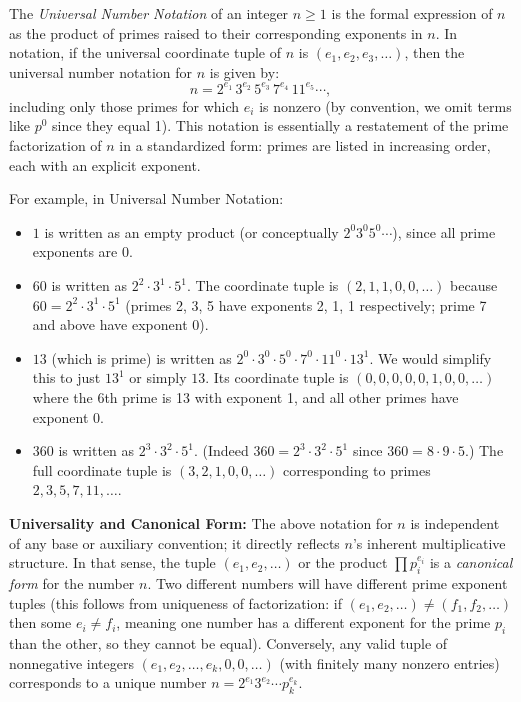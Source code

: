 \documentclass[11pt]{article}
\begin{document}
\begin{definition}\label{def:notation}
The \emph{Universal Number Notation} of an integer $n \ge 1$ is the formal expression of $n$ as the product of primes raised to their corresponding exponents in $n$. In notation, if the universal coordinate tuple of $n$ is $(e_1, e_2, e_3, \dots)$, then the universal number notation for $n$ is given by:
\[ n = 2^{e_1} \, 3^{e_2} \, 5^{e_3} \, 7^{e_4} \, 11^{e_5} \cdots, \]
including only those primes for which $e_i$ is nonzero (by convention, we omit terms like $p^0$ since they equal 1). This notation is essentially a restatement of the prime factorization of $n$ in a standardized form: primes are listed in increasing order, each with an explicit exponent.
\end{definition}

For example, in Universal Number Notation:
\begin{itemize}
  \item $1$ is written as an empty product (or conceptually $2^0 3^0 5^0\cdots$), since all prime exponents are 0.
  \item $60$ is written as $2^2 \cdot 3^1 \cdot 5^1$. The coordinate tuple is $(2,1,1,0,0,\dots)$ because $60 = 2^2 \cdot 3^1 \cdot 5^1$ (primes 2, 3, 5 have exponents 2, 1, 1 respectively; prime 7 and above have exponent 0).
  \item $13$ (which is prime) is written as $2^0 \cdot 3^0 \cdot 5^0 \cdot 7^0 \cdot 11^0 \cdot 13^1$. We would simplify this to just $13^1$ or simply $13$. Its coordinate tuple is $(0,0,0,0,0,1,0,0,\dots)$ where the 6th prime is 13 with exponent 1, and all other primes have exponent 0.
  \item $360$ is written as $2^3 \cdot 3^2 \cdot 5^1$. (Indeed $360 = 2^3 \cdot 3^2 \cdot 5^1$ since $360 = 8 \cdot 9 \cdot 5$.) The full coordinate tuple is $(3,2,1,0,0,\dots)$ corresponding to primes $2,3,5,7,11,\dots$.
\end{itemize}

\noindent \textbf{Universality and Canonical Form:} The above notation for $n$ is independent of any base or auxiliary convention; it directly reflects $n$'s inherent multiplicative structure. In that sense, the tuple $(e_1, e_2, \ldots)$ or the product $\prod p_i^{e_i}$ is a \emph{canonical form} for the number $n$. Two different numbers will have different prime exponent tuples (this follows from uniqueness of factorization: if $(e_1,e_2,\dots) \neq (f_1,f_2,\dots)$ then some $e_i \neq f_i$, meaning one number has a different exponent for the prime $p_i$ than the other, so they cannot be equal). Conversely, any valid tuple of nonnegative integers $(e_1, e_2, \ldots, e_k, 0,0,\ldots)$ (with finitely many nonzero entries) corresponds to a unique number $n = 2^{e_1} 3^{e_2} \cdots p_k^{e_k}$. 
\end{document}
